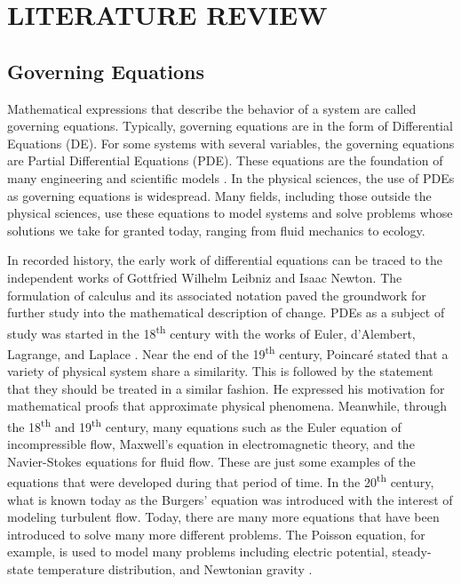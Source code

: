 \chapter{LITERATURE REVIEW}\label{sec:literature_review}

\section{Governing Equations}
\noindent Mathematical expressions that describe the behavior of a system are called governing equations. Typically, governing equations are in the form of Differential Equations (DE). For some systems with several variables, the governing equations are Partial Differential Equations (PDE). These equations are the foundation of many engineering and scientific models \autocite{olverIntroductionPartialDifferential2014,andersonGoverningEquationsFluid1992}. In the physical sciences, the use of PDEs as governing equations is widespread. Many fields, including those outside the physical sciences, use these equations to model systems and solve problems whose solutions we take for granted today, ranging from fluid mechanics to ecology.

In recorded history, the early work of differential equations can be traced to the independent works of Gottfried Wilhelm Leibniz and Isaac Newton. The formulation of calculus and its associated notation paved the groundwork for further study into the mathematical description of change. PDEs as a subject of study was started in the 18\textsuperscript{th} century with the works of Euler, d'Alembert, Lagrange, and Laplace \autocite{brezisPartialDifferentialEquations1998}. Near the end of the 19\textsuperscript{th} century, Poincar\'e stated that a variety of physical system share a similarity. This is followed by the statement that they should be treated in a similar fashion. He expressed his motivation for mathematical proofs that approximate physical phenomena. Meanwhile, through the 18\textsuperscript{th} and 19\textsuperscript{th} century, many equations such as the Euler equation of incompressible flow, Maxwell's equation in electromagnetic theory, and the Navier-Stokes equations for fluid flow. These are just some examples of the equations that were developed during that period of time. In the 20\textsuperscript{th} century, what is known today as the Burgers' equation was introduced with the interest of modeling turbulent flow. Today, there are many more equations that have been introduced to solve many more different problems. The Poisson equation, for example, is used to model many problems including electric potential, steady-state temperature distribution, and Newtonian gravity \autocite{selvaduraiPartialDifferentialEquations2000}.

